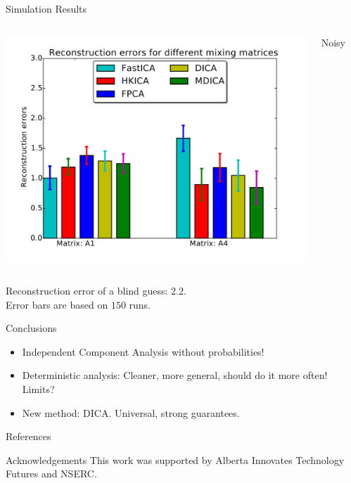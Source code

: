 \documentclass[final]{beamer} %
\newcommand{\bc}{\begin{center}}
\newcommand{\ec}{\end{center}}
\begin{document}
\begin{frame}[c]
\begin{columns}[t,totalwidth=\textwidth]
\begin{column}{0.32\textwidth}
\begin{block}{Simulation Results}
\begin{columns}[t]
			\includegraphics[width=\textwidth]{barchart-A1vsA4-noisy}
			\bc
			Noisy
			\ec
			\end{columns}		
			\bc
			Reconstruction error of a blind guess: $2.2$.\\
			Error bars are based on $150$ runs.
			\ec
		\end{block}
		\vspace{0.48ex}
		\bigskip
		\bigskip
		\begin{block}{Conclusions}
			\begin{itemize}
			\item Independent Component Analysis without probabilities! 
			\item Deterministic analysis: Cleaner, more general, should do it more often! Limits?
			\item New method: DICA. Universal, strong guarantees.
			\end{itemize}
		\end{block}		
		\vspace{0.48ex}
		\bigskip
		\bigskip
		\begin{block}{References}
			\tiny
			
			
		\end{block}
		\vspace{0.48ex}
		\bigskip
		\bigskip
		\begin{block}{Acknowledgements}
			\small
			This work was supported by Alberta Innovates Technology Futures and NSERC.
		\end{block}
	\end{column}
		
	\begin{column}{0.01\textwidth}
	\end{column}
\end{columns}
 
\end{frame}
\end{document}
